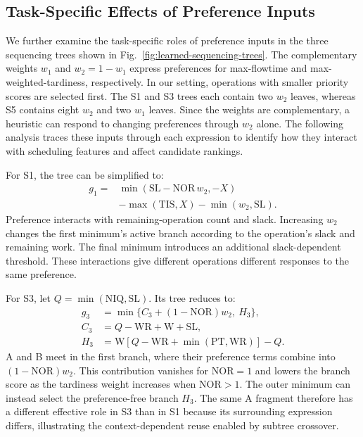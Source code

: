 \documentclass[10pt,journal]{IEEEtran}
\begin{document}
\subsection{Task-Specific Effects of Preference Inputs}
\label{sec:tree-preference-effects}
We further examine the task-specific roles of preference inputs in the three sequencing trees shown in Fig.~\ref{fig:learned-sequencing-trees}. The complementary weights $w_1$ and $w_2=1-w_1$ express preferences for max-flowtime and max-weighted-tardiness, respectively. In our setting, operations with smaller priority scores are selected first. The S1 and S3 trees each contain two $w_2$ leaves, whereas S5 contains eight $w_2$ and two $w_1$ leaves. Since the weights are complementary, a heuristic can respond to changing preferences through $w_2$ alone. The following analysis traces these inputs through each expression to identify how they interact with scheduling features and affect candidate rankings.

For S1, the tree can be simplified to:
\begin{equation}
\begin{aligned}
g_1={}&\min(\mathrm{SL}-\mathrm{NOR}\,w_2,-X)\\
&-\max(\mathrm{TIS},X)-\min(w_2,\mathrm{SL}).
\end{aligned}
\label{eq:case-tree-s1}
\end{equation}
Preference interacts with remaining-operation count and slack. Increasing $w_2$ changes the first minimum's active branch according to the operation's slack and remaining work. The final minimum introduces an additional slack-dependent threshold. These interactions give different operations different responses to the same preference.

For S3, let $Q=\min(\mathrm{NIQ},\mathrm{SL})$. Its tree reduces to:
\begin{equation}
\begin{aligned}
g_3&=\min\{C_3+(1-\mathrm{NOR})w_2,\ H_3\},\\
C_3&=Q-\mathrm{WR}+\mathrm{W}+\mathrm{SL},\\
H_3&=\mathrm{W}[Q-\mathrm{WR}+\min(\mathrm{PT},\mathrm{WR})]-Q.
\end{aligned}
\label{eq:case-tree-s3}
\end{equation}
A and B meet in the first branch, where their preference terms combine into $(1-\mathrm{NOR})w_2$. This contribution vanishes for $\mathrm{NOR}=1$ and lowers the branch score as the tardiness weight increases when $\mathrm{NOR}>1$. The outer minimum can instead select the preference-free branch $H_3$. The same A fragment therefore has a different effective role in S3 than in S1 because its surrounding expression differs, illustrating the context-dependent reuse enabled by subtree crossover.
\end{document}
